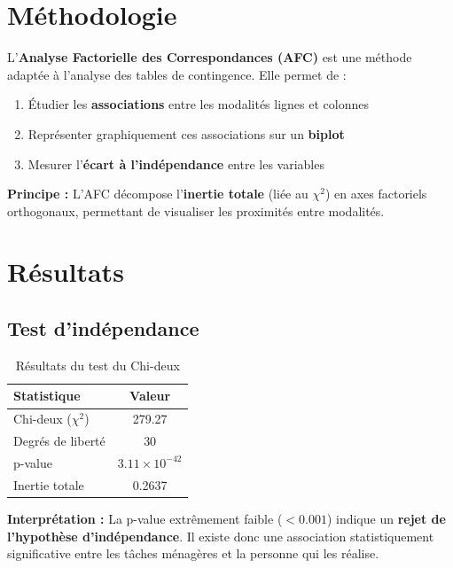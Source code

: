 \documentclass[12pt,a4paper]{article}
\begin{document}
\section{Méthodologie}

L'\textbf{Analyse Factorielle des Correspondances (AFC)} est une méthode adaptée à l'analyse des tables de contingence. Elle permet de :

\begin{enumerate}
    \item Étudier les \textbf{associations} entre les modalités lignes et colonnes
    \item Représenter graphiquement ces associations sur un \textbf{biplot}
    \item Mesurer l'\textbf{écart à l'indépendance} entre les variables
\end{enumerate}

\textbf{Principe :} L'AFC décompose l'\textbf{inertie totale} (liée au $\chi^2$) en axes factoriels orthogonaux, permettant de visualiser les proximités entre modalités.

\section{Résultats}

\subsection{Test d'indépendance}

\begin{table}[H]
\centering
\caption{Résultats du test du Chi-deux}
\begin{tabular}{|l|c|}
\hline
\textbf{Statistique} & \textbf{Valeur} \\
\hline
Chi-deux ($\chi^2$) & 279.27 \\
Degrés de liberté & 30 \\
p-value & $3.11 \times 10^{-42}$ \\
Inertie totale & 0.2637 \\
\hline
\end{tabular}
\end{table}

\textbf{Interprétation :} La p-value extrêmement faible ($< 0.001$) indique un \textbf{rejet de l'hypothèse d'indépendance}. Il existe donc une association statistiquement significative entre les tâches ménagères et la personne qui les réalise.
\end{document}
